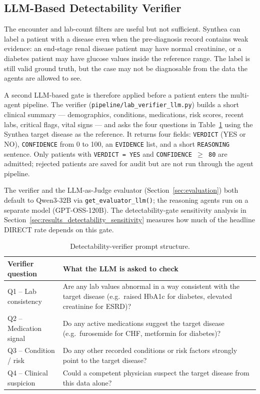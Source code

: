 \subsection{LLM-Based Detectability Verifier}
\label{sec:llm_verifier}

The encounter and lab-count filters are useful but not sufficient. Synthea
can label a patient with a disease even when the pre-diagnosis record
contains weak evidence: an end-stage renal disease patient may have
normal creatinine, or a diabetes patient may have glucose values inside
the reference range. The label is still valid ground truth, but the case
may not be diagnosable from the data the agents are allowed to see.

A second LLM-based gate is therefore applied before a patient enters
the multi-agent pipeline. The verifier
(\texttt{pipeline/lab\_verifier\_llm.py}) builds a short clinical
summary --- demographics, conditions, medications, risk scores, recent
labs, critical flags, vital signs --- and asks the four questions in
Table~\ref{tab:verifier} using the Synthea target disease as the
reference. It returns four fields: \texttt{VERDICT} (YES or NO),
\texttt{CONFIDENCE} from 0 to 100, an \texttt{EVIDENCE} list, and a
short \texttt{REASONING} sentence. Only patients with
\texttt{VERDICT~=~YES} and \texttt{CONFIDENCE~$\geq$~80} are admitted;
rejected patients are saved for audit but are not run through the
agent pipeline.

The verifier and the LLM-as-Judge evaluator
(Section~\ref{sec:evaluation}) both default to Qwen3-32B via
\texttt{get\_evaluator\_llm()}; the reasoning agents run on a
separate model (GPT-OSS-120B). The detectability-gate sensitivity
analysis in Section~\ref{sec:results_detectability_sensitivity}
measures how much of the headline DIRECT rate depends on this gate.

\begin{table}[!htbp]
\centering
\caption{Detectability-verifier prompt structure.}
\label{tab:verifier}
\footnotesize
\begin{tabular}{@{}p{34mm}p{100mm}@{}}
\toprule
\textbf{Verifier question} & \textbf{What the LLM is asked to check} \\
\midrule
Q1 -- Lab consistency      & Are any lab values abnormal in a way consistent with the target disease (e.g.\ raised HbA1c for diabetes, elevated creatinine for ESRD)? \\
Q2 -- Medication signal    & Do any active medications suggest the target disease (e.g.\ furosemide for CHF, metformin for diabetes)? \\
Q3 -- Condition / risk     & Do any other recorded conditions or risk factors strongly point to the target disease? \\
Q4 -- Clinical suspicion   & Could a competent physician suspect the target disease from this data alone? \\
\bottomrule
\end{tabular}
\end{table}

